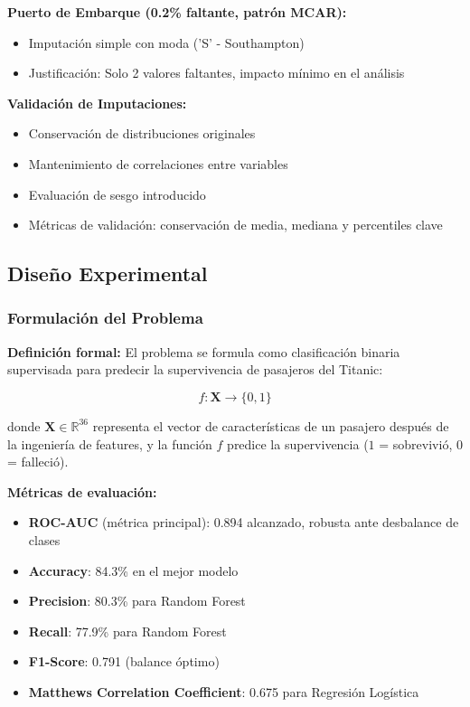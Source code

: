\documentclass[conference]{IEEEtran}
\begin{document}
\textbf{Puerto de Embarque (0.2\% faltante, patrón MCAR):}
\begin{itemize}
\item Imputación simple con moda ('S' - Southampton)
\item Justificación: Solo 2 valores faltantes, impacto mínimo en el análisis
\end{itemize}

\textbf{Validación de Imputaciones:}
\begin{itemize}
\item Conservación de distribuciones originales
\item Mantenimiento de correlaciones entre variables
\item Evaluación de sesgo introducido
\item Métricas de validación: conservación de media, mediana y percentiles clave
\end{itemize}

\subsection{Diseño Experimental}

\subsubsection{Formulación del Problema}

\textbf{Definición formal:}
El problema se formula como clasificación binaria supervisada para predecir la supervivencia de pasajeros del Titanic:

\begin{equation}
f: \mathbf{X} \rightarrow \{0, 1\}
\end{equation}

donde $\mathbf{X} \in \mathbb{R}^{36}$ representa el vector de características de un pasajero después de la ingeniería de features, y la función $f$ predice la supervivencia ($1$ = sobrevivió, $0$ = falleció).

\textbf{Métricas de evaluación:}
\begin{itemize}
\item \textbf{ROC-AUC} (métrica principal): 0.894 alcanzado, robusta ante desbalance de clases
\item \textbf{Accuracy}: 84.3\% en el mejor modelo
\item \textbf{Precision}: 80.3\% para Random Forest
\item \textbf{Recall}: 77.9\% para Random Forest
\item \textbf{F1-Score}: 0.791 (balance óptimo)
\item \textbf{Matthews Correlation Coefficient}: 0.675 para Regresión Logística
\end{itemize}
\end{document}
